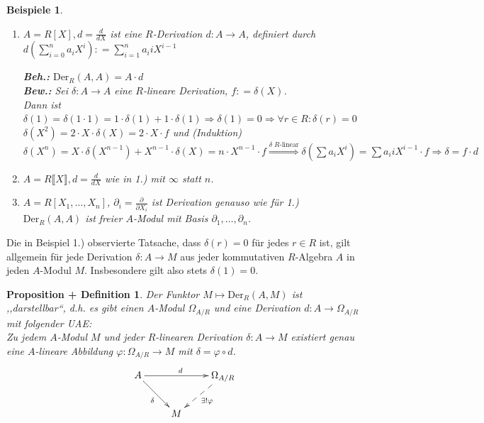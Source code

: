 \documentclass[a4paper,12pt]{scrbook}
\theoremstyle{break}
\newtheorem{PropDef}[Def]{Proposition + Definition}
\theoremstyle{nonumberbreak}
\newtheorem{nnBsp}{Beispiele}
\theoremstyle{nonumberplain}
\newcommand{\defeqr}[0]{\mathrel{\mathop:}=}
\begin{document}
\begin{nnBsp}
  \begin{enumerate}
  \item[1.)] $A = R[X], d = \frac{d}{dX}$ ist eine $R$-Derivation $d: A \to
    A$, definiert durch $d(\sum_{i=0}^n a_i X^i) \defeqr \sum_{i=1}^n a_i
    i X^{i-1}$
    
    \textbf{Beh.:} $\mbox{Der}_R(A,A) = A \cdot d$ \\
    \textbf{Bew.:} Sei $\delta: A \to A$ eine $R$-lineare Derivation, $f \defeqr \delta(X)$. \\
    Dann ist $\delta(1) = \delta(1 \cdot 1) =1 \cdot \delta(1) + 1
    \cdot \delta(1) \Rightarrow \delta(1) = 0
    \Rightarrow \forall r \in R:\delta(r) = 0$ \\
    $\delta(X^2) = 2 \cdot X \cdot \delta(X) = 2 \cdot X \cdot f$ und (Induktion) $\delta(X^n) = X
    \cdot \delta(X^{n-1}) + X^{n-1} \cdot \delta(X) = n \cdot X^{n-1}\cdot f
    \overset{\delta\; R\text{-linear}}{\Rightarrow} \delta(\sum a_i
    X^i) = \sum a_i i X^{i-1} \cdot f \Rightarrow \delta = f \cdot d$
    
  \item[2.)] $A = R \llbracket X \rrbracket, d = \frac{d}{dX}$ wie in 1.) mit
    $\infty$ statt $n$.
  \item[3.)] $A = R[X_1,\dots,X_n]$, $\partial_i = \frac{\partial}{\partial
      X_i}$ ist Derivation genauso wie für 1.)\\
    $\mbox{Der}_R(A,A)$ ist freier $A$-Modul mit Basis $\partial_1, \dots , \partial_n$.
  \end{enumerate}
\end{nnBsp}

Die in Beispiel 1.) observierte Tatsache, dass $\delta\left(r\right) = 0$ für jedes $r\in R$ ist,
gilt allgemein für jede Derivation $\delta : A \to M$ aus jeder kommutativen $R$-Algebra $A$
in jeden $A$-Modul $M$. Insbesondere gilt also stets $\delta\left(1\right) = 0$.

\begin{PropDef} \label{1.21}
  Der Funktor $M \mapsto \mbox{Der}_R(A,M)$ ist ,,darstellbar``, d.h. es gibt
  einen $A$-Modul $\Omega_{A/R}$ und eine Derivation $d: A \to \Omega_{A/R}$ mit
  folgender UAE:\\
  Zu jedem $A$-Modul $M$ und jeder $R$-linearen Derivation $\delta: A \to M$
  existiert genau eine $A$-lineare Abbildung $\varphi: \Omega_{A/R} \to M$ mit
  $\delta = \varphi \circ d$.
  \[
    \begin{xy}
      \xymatrix{
         A \ar[rr]^{d} \ar[rd]_{\delta}  &     &  \Omega_{A/R} \ar@{-->}[dl]^{\exists!\varphi}  \\
                                         &  M  &
      }
    \end{xy}
  \]
\end{PropDef}
\end{document}
